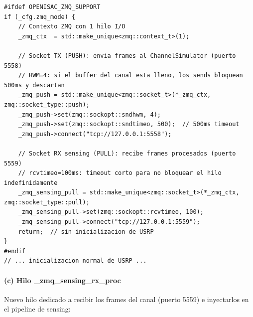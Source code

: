 \documentclass[11pt,a4paper]{article}
\begin{document}
\begin{lstlisting}[style=cpp,
  caption={Creación de sockets ZMQ en lugar de USRP — OFDMModulator.cpp}]
#ifdef OPENISAC_ZMQ_SUPPORT
if (_cfg.zmq_mode) {
    // Contexto ZMQ con 1 hilo I/O
    _zmq_ctx  = std::make_unique<zmq::context_t>(1);

    // Socket TX (PUSH): envia frames al ChannelSimulator (puerto 5558)
    // HWM=4: si el buffer del canal esta lleno, los sends bloquean 500ms y descartan
    _zmq_push = std::make_unique<zmq::socket_t>(*_zmq_ctx, zmq::socket_type::push);
    _zmq_push->set(zmq::sockopt::sndhwm, 4);
    _zmq_push->set(zmq::sockopt::sndtimeo, 500);  // 500ms timeout
    _zmq_push->connect("tcp://127.0.0.1:5558");

    // Socket RX sensing (PULL): recibe frames procesados (puerto 5559)
    // rcvtimeo=100ms: timeout corto para no bloquear el hilo indefinidamente
    _zmq_sensing_pull = std::make_unique<zmq::socket_t>(*_zmq_ctx, zmq::socket_type::pull);
    _zmq_sensing_pull->set(zmq::sockopt::rcvtimeo, 100);
    _zmq_sensing_pull->connect("tcp://127.0.0.1:5559");
    return;  // sin inicializacion de USRP
}
#endif
// ... inicializacion normal de USRP ...
\end{lstlisting}

\paragraph{(c) Hilo \_zmq\_sensing\_rx\_proc}

Nuevo hilo dedicado a recibir los frames del canal (puerto 5559) e inyectarlos
en el pipeline de sensing:
\end{document}
